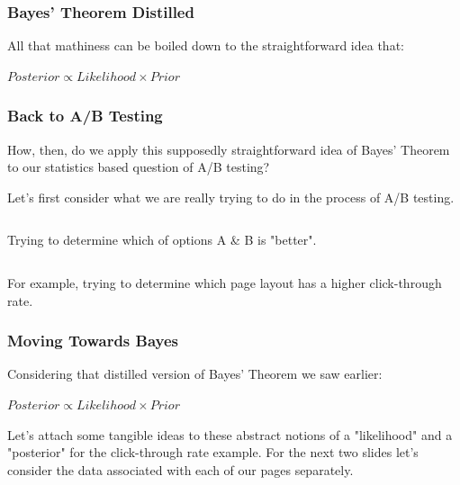 \documentclass{beamer}
\begin{document}
\begin{frame}
  \frametitle{Bayes' Theorem Distilled}
  All that mathiness can be boiled down to the straightforward idea that:
  \vspace{4mm}

  \centering
  {\LARGE $ Posterior \propto Likelihood \times Prior $}
\end{frame}

\begin{frame}
  \frametitle{Back to A/B Testing}
  How, then, do we apply this supposedly straightforward idea of Bayes' Theorem to our statistics based question of A/B testing?
  \vspace{3mm}

  Let's first consider what we are really trying to do in the process of A/B testing. \vspace{3mm}
  \pause

  \begin{columns}
    \begin{block}{}
      Trying to determine which of options A \& B is "better".
    \end{block}
  \end{columns}

  \vspace{6mm}
  \pause
  For example, trying to determine which page layout has a higher click-through rate.
\end{frame}

\begin{frame}
  \frametitle{Moving Towards Bayes}
  Considering that distilled version of Bayes' Theorem we saw earlier:

  \begin{center}
    {\large $ Posterior \propto Likelihood \times Prior $}
  \end{center}
  \vspace{2mm}
  \pause

  Let's attach some tangible ideas to these abstract notions of a "likelihood" and a "posterior" for the click-through rate example. For the next two slides let's consider the data associated with each of our pages separately.
\end{frame}
\end{document}
